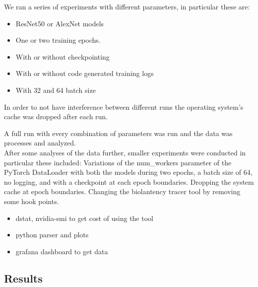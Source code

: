 \documentclass[conference]{IEEEtran}
\begin{document}
We ran a series of experiments with different parameters, in particular these are:
\begin{itemize}
	\item ResNet50 or AlexNet models
	\item One or two training epochs.
	\item With or without checkpointing
	\item With or without code generated training logs
	\item With 32 and 64 batch size
\end{itemize}
In order to not have interference between different runs the operating system's cache was dropped after each run.

A full run with every combination of parameters was run and the data was processes and analyzed.\\
After some analyses of the data further, smaller experiments were conducted in particular these included:
Variations of the num\_workers parameter of the PyTorch DataLoader with both the models during two epochs, a batch size of 64, no logging, and with a checkpoint at each epoch boundaries.
Dropping the system cache at epoch boundaries.
Changing the biolantency tracer tool by removing some hook points.


\begin{itemize}
	\item dstat, nvidia-smi to get cost of using the tool
	\item python parser and plots
	\item grafana dashboard to get data
\end{itemize}

\subsection{Results}
\end{document}
